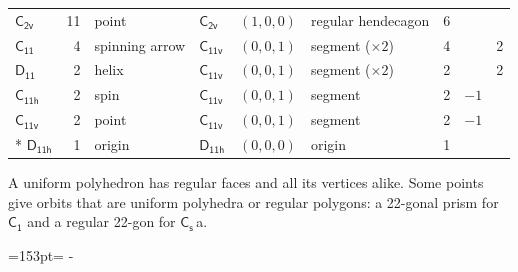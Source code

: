 \documentclass[10pt,a4paper]{article}
\newcommand{\needspace}[1]{\par\penalty-100\begingroup\dimen0=#1\relax\dimen2=\pagegoal
  \advance\dimen2-\pagetotal\ifdim\dimen0>\dimen2\relax\ifdim\dimen2>0pt\vfil\break\fi\fi
  \endgroup}
\numberwithin{equation}{section}
\newcommand{\grp}[1]{\mathsf{#1}}
\newcommand{\clsletter}[1]{\,{\scriptsize\color{black!55}#1}}
\newlength{\fillwidth}\newlength{\cellwidth}\newlength{\colwidth}
\begin{document}
{\begin{longtable}{@{}lrllllr>{\RaggedRight\arraybackslash}p{\fillwidth}r@{}}
\href{C2v.pdf}{$\grp{C_{2v}}$} & 11 & point & \href{C2v.pdf}{$\grp{C_{2v}}$} & $(1, 0, 0)$ & regular hendecagon & 6 &  & \\
\href{C11.pdf}{$\grp{C_{11}}$} & 4 & spinning arrow & \href{C11v.pdf}{$\grp{C_{11v}}$} & $(0, 0, 1)$ & segment (${\times}2$) & 4 &  & 2\\
\href{D11.pdf}{$\grp{D_{11}}$} & 2 & helix & \href{C11v.pdf}{$\grp{C_{11v}}$} & $(0, 0, 1)$ & segment (${\times}2$) & 2 &  & 2\\
\href{C11h.pdf}{$\grp{C_{11h}}$} & 2 & spin & \href{C11v.pdf}{$\grp{C_{11v}}$} & $(0, 0, 1)$ & segment & 2 & ${-1}$ & \\
\href{C11v.pdf}{$\grp{C_{11v}}$} & 2 & point & \href{C11v.pdf}{$\grp{C_{11v}}$} & $(0, 0, 1)$ & segment & 2 & ${-1}$ & \\*
\href{D11h.pdf}{$\grp{D_{11h}}$} & 1 & origin & \href{D11h.pdf}{$\grp{D_{11h}}$} & $(0, 0, 0)$ & origin & 1 &  & \\
\bottomrule\end{longtable}}
A uniform polyhedron has regular faces and all its vertices alike. Some points give orbits that are uniform polyhedra or regular polygons: a 22-gonal prism for \href{C1.pdf}{$\grp{C_{1}}$} and a regular 22-gon for \href{C1v.pdf}{$\grp{C_{s}}$}\clsletter{a}.
\needspace{153pt}
\end{document}
